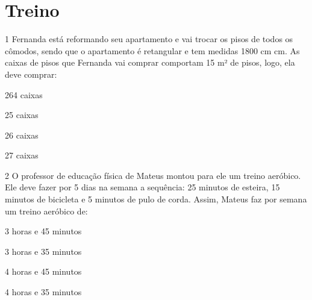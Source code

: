 \pagebreak

\section*{Treino}

\num{1} Fernanda está reformando seu apartamento e vai trocar os pisos de
todos os cômodos, sendo que o apartamento é retangular e tem medidas
1800 cm  cm. As caixas de pisos que
Fernanda vai comprar comportam 15 m² de pisos, logo, ela deve comprar:

\begin{escolha}[itemsep=0pt]
\item 264 caixas
\item 25 caixas
\item 26 caixas
\item 27 caixas
\end{escolha}



\num{2} O professor de educação física de Mateus montou para ele um treino
aeróbico. Ele deve fazer por 5 dias na semana a sequência: 25 minutos de
esteira, 15 minutos de bicicleta e 5 minutos de pulo de corda. Assim,
Mateus faz por semana um treino aeróbico de:

\begin{escolha}[itemsep=0pt]
\item 3 horas e 45 minutos
\item 3 horas e 35 minutos
\item 4 horas e 45 minutos
\item 4 horas e 35 minutos
\end{escolha}

